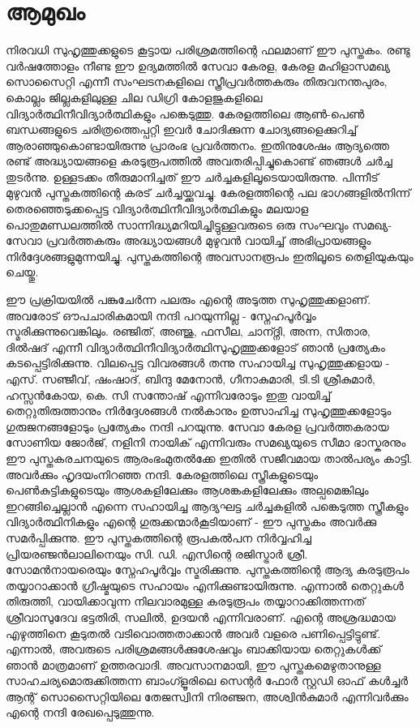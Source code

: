 \chapter*{ആമുഖം}

നിരവധി സുഹൃത്തുക്കളുടെ കൂട്ടായ പരിശ്രമത്തിന്റെ ഫലമാണ് ഈ പുസ്തകം. രണ്ടു വർഷത്തോളം നീണ്ട ഈ ഉദ്യമത്തിൽ സേവാ കേരള, കേരള മഹിളാസമഖ്യ സൊസൈറ്റി എന്നീ സംഘടനകളിലെ സ്ത്രീപ്രവർത്തകരും തിരുവനന്തപുരം, കൊല്ലം ജില്ലകളിലുള്ള ചില ഡിഗ്രി കോളജുകളിലെ വിദ്യാർത്ഥിനീവിദ്യാർത്ഥികളും പങ്കെടുത്തു. കേരളത്തിലെ ആൺ-പെൺ ബന്ധങ്ങളുടെ ചരിത്രത്തെപ്പറ്റി ഇവർ ചോദിക്കുന്ന ചോദ്യങ്ങളെക്കുറിച്ച് ആരാഞ്ഞുകൊണ്ടായിരുന്നു പ്രാരംഭ പ്രവർത്തനം. ഇതിനുശേഷം ആദ്യത്തെ രണ്ട് അദ്ധ്യായങ്ങളെ കരടുരൂപത്തിൽ അവതരിപ്പിച്ചുകൊണ്ട് ഞങ്ങൾ ചർച്ച തുടർന്നു. ഉള്ളടക്കം തീരുമാനിച്ചത് ഈ ചർച്ചകളിലൂടെയായിരുന്നു. പിന്നീട് മുഴുവൻ പുസ്തകത്തിന്റെ കരട് ചർച്ചയ്ക്കുവച്ചു. കേരളത്തിന്റെ പല ഭാഗങ്ങളിൽനിന്ന് തെരഞ്ഞെടുക്കപ്പെട്ട വിദ്യാർത്ഥിനീവിദ്യാർത്ഥികളും മലയാള പൊതുമണ്ഡലത്തിൽ സാന്നിദ്ധ്യമറിയിച്ചിട്ടുള്ളവരുടെ ഒരു സംഘവും സമഖ്യ-സേവാ പ്രവർത്തകരും അദ്ധ്യായങ്ങൾ മുഴുവൻ വായിച്ച് അഭിപ്രായങ്ങളും നിർദ്ദേശങ്ങളുമുന്നയിച്ചു. പുസ്തകത്തിന്റെ അവസാനരൂപം ഇതിലൂടെ തെളിയുകയും ചെയ്തു.


ഈ പ്രക്രിയയിൽ പങ്കുചേർന്ന പലരും എന്റെ അടുത്ത സുഹൃത്തുക്കളാണ്. അവരോട് ഔപചാരികമായി നന്ദി പറയുന്നില്ല - സ്നേഹപൂർവ്വം സ്മരിക്കുന്നുവെങ്കിലും. രഞ്ജിത്, അഞ്ജു, ഫസീല, ചാന്ദ്നി, അന്ന, സിതാര, ദിൽഷദ് എന്നീ വിദ്യാർത്ഥിനീവിദ്യാർത്ഥിസുഹൃത്തുക്കളോട് ഞാൻ പ്രത്യേകം കടപ്പെട്ടിരിക്കുന്നു. വിലപ്പെട്ട വിവരങ്ങൾ തന്നു സഹായിച്ച സുഹൃത്തുക്കളായ - എസ്. സഞ്ജീവ്, ഷംഷാദ്, ബിന്ദു മേനോൻ, ഗീനാകുമാരി, ടി.ടി ശ്രീകുമാർ, ഹസ്സൻകോയ, കെ. സി സന്തോഷ് എന്നിവരോടും ഇതു വായിച്ച് തെറ്റുതിരുത്താനും നിർദ്ദേശങ്ങൾ നൽകാനും ഉത്സാഹിച്ച സുഹൃത്തുക്കളോടും ഗുരുജനങ്ങളോടും പ്രത്യേകം നന്ദി പറയുന്നു. സേവാ കേരള പ്രവർത്തകരായ സോണിയ ജോർജ്, നളിനി നായിക് എന്നിവരും സമഖ്യയുടെ സീമാ ഭാസ്കരനും ഈ പുസ്തകരചനയുടെ ആരംഭംമുതൽക്കേ ഇതിൽ സജീവമായ താൽപര്യം കാട്ടി. അവർക്കും ഹൃദയംനിറഞ്ഞ നന്ദി. കേരളത്തിലെ സ്ത്രീകളുടെയും പെൺകുട്ടികളുടെയും ആശകളിലേക്കും ആശങ്കകളിലേക്കും അല്പമെങ്കിലും ഇറങ്ങിച്ചെല്ലാൻ എന്നെ സഹായിച്ച ആദ്യഘട്ട ചർച്ചകളിൽ പങ്കെടുത്ത സ്ത്രീകളും വിദ്യാർത്ഥിനികളും എന്റെ ഗുരുക്കന്മാർകൂടിയാണ് - ഈ പുസ്തകം അവർക്കു സമർപ്പിക്കുന്നു. ഈ പുസ്തകത്തിന്റെ രൂപകൽപന നിർവ്വഹിച്ച പ്രിയരഞ്ജൻലാലിനെയും സി. ഡി. എസിന്റെ രജിസ്ട്രാർ ശ്രീ. സോമൻനായരെയും സ്നേഹപൂർവ്വം സ്മരിക്കുന്നു. പുസ്തകത്തിന്റെ ആദ്യ കരടുരൂപം തയ്യാറാക്കാൻ ഗ്രീഷ്മയുടെ സഹായം എനിക്കുണ്ടായിരുന്നു. എന്നാൽ തെറ്റുകൾ തിരുത്തി, വായിക്കാവുന്ന നിലവാരമുള്ള കരടുരൂപം തയ്യാറാക്കിത്തന്നത് ശ്രീവാസുദേവ ഭട്ടതിരി, സലിൽ, ഉദയൻ എന്നിവരാണ്. എന്റെ അശ്രദ്ധമായ എഴുത്തിനെ കൂടുതൽ വടിവൊത്തതാക്കാൻ അവർ വളരെ പണിപ്പെട്ടിട്ടുണ്ട്. എന്നാൽ, അവരുടെ പരിശ്രമങ്ങൾക്കുശേഷവും ബാക്കിയായ തെറ്റുകൾക്ക് ഞാൻ മാത്രമാണ് ഉത്തരവാദി. അവസാനമായി, ഈ പുസ്തകമെഴുതാനുള്ള സാഹചര്യമൊരുക്കിത്തന്ന ബാംഗ്ളൂരിലെ സെന്റർ ഫോർ സ്റ്റഡി ഓഫ് കൾച്ചർ ആന്റ് സൊസൈറ്റിയിലെ തേജസ്വിനി നിരഞ്ജന, അശ്വിൻകുമാർ എന്നിവർക്കും എന്റെ നന്ദി രേഖപ്പെടുത്തുന്നു.


